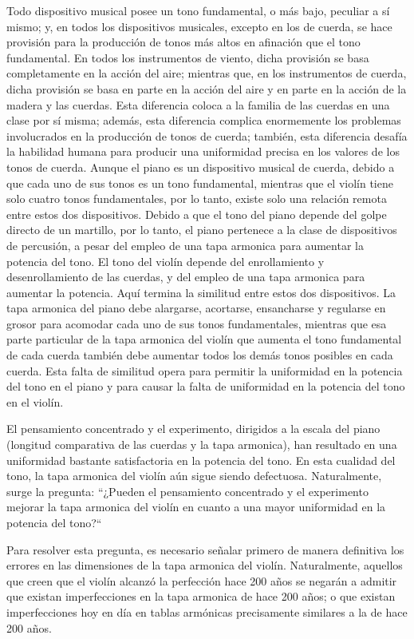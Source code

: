 \documentclass[12pt]{book}
\begin{document}
Todo dispositivo musical posee un tono fundamental, o más bajo, peculiar a sí mismo; y, en todos los dispositivos musicales, excepto en los de cuerda, se hace provisión para la producción de tonos más altos en afinación que el tono fundamental. En todos los instrumentos de viento, dicha provisión se basa completamente en la acción del aire; mientras que, en los instrumentos de cuerda, dicha provisión se basa en parte en la acción del aire y en parte en la acción de la madera y las cuerdas. Esta diferencia coloca a la familia de las cuerdas en una clase por sí misma; además, esta diferencia complica enormemente los problemas involucrados en la producción de tonos de cuerda; también, esta diferencia desafía la habilidad humana para producir una uniformidad precisa en los valores de los tonos de cuerda. Aunque el piano es un dispositivo musical de cuerda, debido a que cada uno de sus tonos es un tono fundamental, mientras que el violín tiene solo cuatro tonos fundamentales, por lo tanto, existe solo una relación remota entre estos dos dispositivos. Debido a que el tono del piano depende del golpe directo de un martillo, por lo tanto, el piano pertenece a la clase de dispositivos de percusión, a pesar del empleo de una tapa armonica para aumentar la potencia del tono. El tono del violín depende del enrollamiento y desenrollamiento de las cuerdas, y del empleo de una tapa armonica para aumentar la potencia. Aquí termina la similitud entre estos dos dispositivos. La tapa armonica del piano debe alargarse, acortarse, ensancharse y regularse en grosor para acomodar cada uno de sus tonos fundamentales, mientras que esa parte particular de la tapa armonica del violín que aumenta el tono fundamental de cada cuerda también debe aumentar todos los demás tonos posibles en cada cuerda. Esta falta de similitud opera para permitir la uniformidad en la potencia del tono en el piano y para causar la falta de uniformidad en la potencia del tono en el violín.

El pensamiento concentrado y el experimento, dirigidos a la escala del piano (longitud comparativa de las cuerdas y la tapa armonica), han resultado en una uniformidad bastante satisfactoria en la potencia del tono. En esta cualidad del tono, la tapa armonica del violín aún sigue siendo defectuosa. Naturalmente, surge la pregunta: ``¿Pueden el pensamiento concentrado y el experimento mejorar la tapa armonica del violín en cuanto a una mayor uniformidad en la potencia del tono?``

Para resolver esta pregunta, es necesario señalar primero de manera definitiva los errores en las dimensiones de la tapa armonica del violín. Naturalmente, aquellos que creen que el violín alcanzó la perfección hace 200 años se negarán a admitir que existan imperfecciones en la tapa armonica de hace 200 años; o que existan imperfecciones hoy en día en tablas armónicas precisamente similares a la de hace 200 años.
\end{document}
